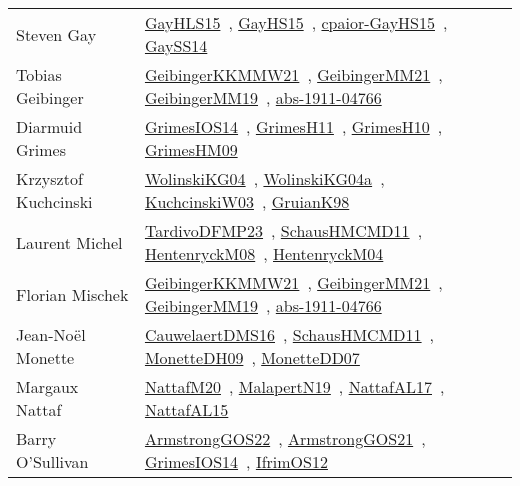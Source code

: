 {\begin{longtable}{p{4cm}p{20cm}}
Steven Gay & \href{papers/GayHLS15.pdf}{GayHLS15}~\cite{GayHLS15}, \href{papers/GayHS15.pdf}{GayHS15}~\cite{GayHS15}, \href{papers/cpaior-GayHS15.pdf}{cpaior-GayHS15}~\cite{cpaior-GayHS15}, \href{papers/GaySS14.pdf}{GaySS14}~\cite{GaySS14}\\
Tobias Geibinger & \href{papers/GeibingerKKMMW21.pdf}{GeibingerKKMMW21}~\cite{GeibingerKKMMW21}, \href{papers/GeibingerMM21.pdf}{GeibingerMM21}~\cite{GeibingerMM21}, \href{papers/GeibingerMM19.pdf}{GeibingerMM19}~\cite{GeibingerMM19}, \href{articles/abs-1911-04766.pdf}{abs-1911-04766}~\cite{abs-1911-04766}\\
Diarmuid Grimes & \href{articles/GrimesIOS14.pdf}{GrimesIOS14}~\cite{GrimesIOS14}, \href{papers/GrimesH11.pdf}{GrimesH11}~\cite{GrimesH11}, \href{papers/GrimesH10.pdf}{GrimesH10}~\cite{GrimesH10}, \href{papers/GrimesHM09.pdf}{GrimesHM09}~\cite{GrimesHM09}\\
Krzysztof Kuchcinski & \href{papers/WolinskiKG04.pdf}{WolinskiKG04}~\cite{WolinskiKG04}, \href{}{WolinskiKG04a}~\cite{WolinskiKG04a}, \href{articles/KuchcinskiW03.pdf}{KuchcinskiW03}~\cite{KuchcinskiW03}, \href{papers/GruianK98.pdf}{GruianK98}~\cite{GruianK98}\\
Laurent Michel & \href{papers/TardivoDFMP23.pdf}{TardivoDFMP23}~\cite{TardivoDFMP23}, \href{articles/SchausHMCMD11.pdf}{SchausHMCMD11}~\cite{SchausHMCMD11}, \href{papers/HentenryckM08.pdf}{HentenryckM08}~\cite{HentenryckM08}, \href{papers/HentenryckM04.pdf}{HentenryckM04}~\cite{HentenryckM04}\\
Florian Mischek & \href{papers/GeibingerKKMMW21.pdf}{GeibingerKKMMW21}~\cite{GeibingerKKMMW21}, \href{papers/GeibingerMM21.pdf}{GeibingerMM21}~\cite{GeibingerMM21}, \href{papers/GeibingerMM19.pdf}{GeibingerMM19}~\cite{GeibingerMM19}, \href{articles/abs-1911-04766.pdf}{abs-1911-04766}~\cite{abs-1911-04766}\\
Jean{-}No{\"{e}}l Monette & \href{papers/CauwelaertDMS16.pdf}{CauwelaertDMS16}~\cite{CauwelaertDMS16}, \href{articles/SchausHMCMD11.pdf}{SchausHMCMD11}~\cite{SchausHMCMD11}, \href{papers/MonetteDH09.pdf}{MonetteDH09}~\cite{MonetteDH09}, \href{papers/MonetteDD07.pdf}{MonetteDD07}~\cite{MonetteDD07}\\
Margaux Nattaf & \href{papers/NattafM20.pdf}{NattafM20}~\cite{NattafM20}, \href{papers/MalapertN19.pdf}{MalapertN19}~\cite{MalapertN19}, \href{articles/NattafAL17.pdf}{NattafAL17}~\cite{NattafAL17}, \href{articles/NattafAL15.pdf}{NattafAL15}~\cite{NattafAL15}\\
Barry O'Sullivan & \href{papers/ArmstrongGOS22.pdf}{ArmstrongGOS22}~\cite{ArmstrongGOS22}, \href{papers/ArmstrongGOS21.pdf}{ArmstrongGOS21}~\cite{ArmstrongGOS21}, \href{articles/GrimesIOS14.pdf}{GrimesIOS14}~\cite{GrimesIOS14}, \href{papers/IfrimOS12.pdf}{IfrimOS12}~\cite{IfrimOS12}\\

\end{longtable}}
